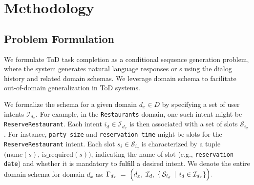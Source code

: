 \vspace{-5pt}
\section{Methodology}
\vspace{-4pt}
\subsection{Problem Formulation}
We formulate ToD task completion as a conditional sequence generation problem, where the system generates natural language responses or {\apicall}s using the dialog history and related domain schemas. 
We leverage domain schema to facilitate out-of-domain generalization in ToD systems.

We formalize the schema for a given domain \(d_x \in D\) by specifying a set of user intents \(\mathcal{I}_{d_x}\).
For example, in the \texttt{Restaurants} domain, one such intent might be \texttt{ReserveRestaurant}.
Each intent \(i_d \in \mathcal{I}_{d_x}\) is then associated with a set of slots \(\mathcal{S}_{i_d}\).
For instance, \texttt{party size} and \texttt{reservation time} might be slots for the \texttt{ReserveRestaurant} intent. 
Each slot \(s_{i} \in \mathcal{S}_{i_d}\) is characterized by a tuple \(\bigl(\text{name}(s),\,\text{is\_required}(s)\bigr)\), indicating the name of slot (e.g., \texttt{reservation date}) and whether it is mandatory to fulfill a desired intent.
We denote the entire domain schema for domain \(d_x\) as:
\(
\Gamma_{d_x} 
\;=\; 
\Bigl(d_x,\; \mathcal{I}_d,\;\{\,\mathcal{S}_{i_d}\,\mid\,i_d\in\mathcal{I}_{d_x}\}\Bigr).
\)


